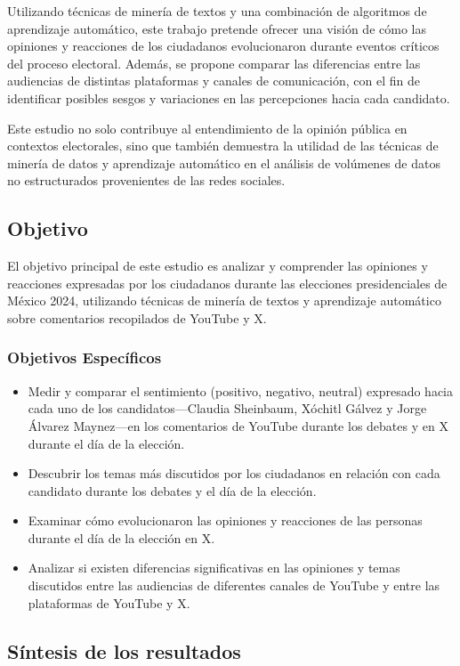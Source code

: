 \documentclass[10pt, a4paper]{article}
\begin{document}
	Utilizando técnicas de minería de textos y una combinación de algoritmos de aprendizaje automático, este trabajo pretende ofrecer una visión de cómo las opiniones y reacciones de los ciudadanos evolucionaron durante eventos críticos del proceso electoral. Además, se propone comparar las diferencias entre las audiencias de distintas plataformas y canales de comunicación, con el fin de identificar posibles sesgos y variaciones en las percepciones hacia cada candidato.
	
	Este estudio no solo contribuye al entendimiento de la opinión pública en contextos electorales, sino que también demuestra la utilidad de las técnicas de minería de datos y aprendizaje automático en el análisis de volúmenes de datos no estructurados provenientes de las redes sociales.
	
	\subsection{Objetivo}
	El objetivo principal de este estudio es analizar y comprender las opiniones y reacciones expresadas por los ciudadanos durante las elecciones presidenciales de México 2024, utilizando técnicas de minería de textos y aprendizaje automático sobre comentarios recopilados de YouTube y X. 
	
	\subsubsection{Objetivos Específicos}
	\begin{itemize}
		\item Medir y comparar el sentimiento (positivo, negativo, neutral) expresado hacia cada uno de los candidatos—Claudia Sheinbaum, Xóchitl Gálvez y Jorge Álvarez Maynez—en los comentarios de YouTube durante los debates y en X durante el día de la elección.
		\item  Descubrir los temas más discutidos por los ciudadanos en relación con cada candidato durante los debates y el día de la elección.
		\item Examinar cómo evolucionaron las opiniones y reacciones de las personas durante el día de la elección en X.
		\item Analizar si existen diferencias significativas en las opiniones y temas discutidos entre las audiencias de diferentes canales de YouTube y entre las plataformas de YouTube y X.
	\end{itemize}
	
	\subsection{Síntesis de los resultados}
	
\end{document}
